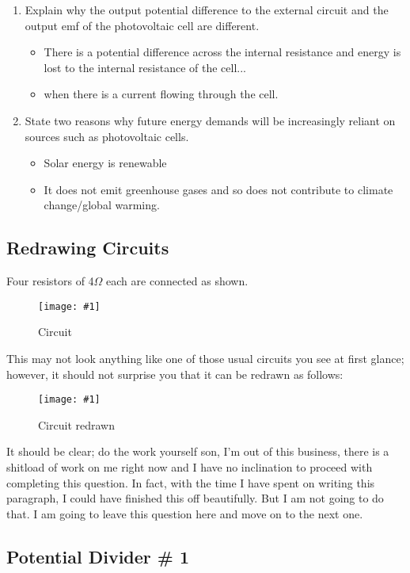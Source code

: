 \documentclass[a4paper,12pt]{article}
\newcommand{\img}[4]{\begin{center}
  \begin{figure}[H]
    \centering
    \texttt{[image: \#1]}
    \caption{#3}
    \label{fig:#4}
  \end{figure}
\end{center}}
\begin{document}
\begin{enumerate}[label=(\alph*)]
  \item Explain why the output potential difference to the external circuit and the output emf of the photovoltaic cell are different.
        \begin{itemize}
          \item There is a potential difference across the internal resistance and energy is lost to the internal resistance of the cell...
          \item when there is a current flowing through the cell.
        \end{itemize}
  \item State two reasons why future energy demands will be increasingly reliant on sources such as photovoltaic cells.
        \begin{itemize}
          \item Solar energy is renewable
          \item It does not emit greenhouse gases and so does not contribute to climate change/global warming.
        \end{itemize}
\end{enumerate}

\pagebreak

\subsection{Redrawing Circuits}

Four resistors of 4$\Omega$ each are connected as shown.

\img{ex/20a.png}{0.4}{Circuit}{ex20a}

This may not look anything like one of those usual circuits you see at first glance; however, it should not surprise you that it can be redrawn as follows:

\img{ex/20.jpg}{0.7}{Circuit redrawn}{ex20}

It should be clear; do the work yourself son, I'm out of this business, there is a shitload of work on me right now and I have no inclination to proceed with completing this question. In fact, with the time I have spent on writing this paragraph, I could have finished this off beautifully. But I am not going to do that. I am going to leave this question here and move on to the next one.

\pagebreak

\subsection{Potential Divider \# 1}
\end{document}
